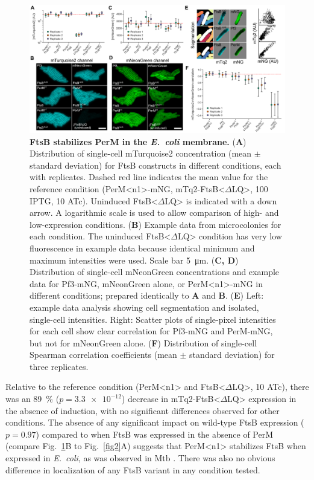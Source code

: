 \documentclass[twocolumn,pdflatex,sn-nature]{sn-jnl}%
\def\textsuperscript#1{<#1>}%
\newcommand\ec{\textit{E.~coli}}
\newcommand\mtb{Mtb}
\newcommand\ftsbdLQ{FtsB\textsuperscript{$\Delta{}$LQ}}
\newcommand\permN{PerM\textsuperscript{n1}}
\begin{document}
\begin{figure}[htb]
\centering
\includegraphics[width=1.0\textwidth]{../figures/fig3.png}
\caption{
    \textbf{FtsB stabilizes PerM in the \ec{} membrane.}
    (\textbf{A}) Distribution of single-cell mTurquoise2 concentration (mean $\pm$ standard deviation) for FtsB constructs in different conditions, each with replicates. Dashed red line indicates the mean value for the reference condition (\permN{}-mNG, mTq2-\ftsbdLQ{}, \qty{100}{\uM} IPTG, \qty{10}{\nM} ATc). Uninduced \ftsbdLQ{} is indicated with a down arrow. A logarithmic scale is used to allow comparison of high- and low-expression conditions.
    (\textbf{B}) Example data from microcolonies for each condition. The uninduced \ftsbdLQ{} condition has very low fluorescence in example data because identical minimum and maximum intensities were used. Scale bar \qty{5}{\um}.
    (\textbf{C, D}) Distribution of single-cell mNeonGreen concentrations and example data for Pf3-mNG, mNeonGreen alone, or \permN{}-mNG in different conditions; prepared identically to \textbf{A} and \textbf{B}.
    (\textbf{E}) Left: example data analysis showing cell segmentation and isolated, single-cell intensities. Right: Scatter plots of single-pixel intensities for each cell show clear correlation for Pf3-mNG and PerM-mNG, but not for mNeonGreen alone. (\textbf{F}) Distribution of single-cell Spearman correlation coefficients (mean $\pm$ standard deviation) for three replicates.
}\label{fig3}
\end{figure}

Relative to the reference condition (\permN{} and \ftsbdLQ{}, \qty{10}{\nM} ATc), there was an \qty{89}{\percent} ($p=\num{3.3e-12}$) decrease in mTq2-\ftsbdLQ{} expression in the absence of induction, with no significant differences observed for other conditions.
The absence of any significant impact on wild-type FtsB expression ($p=0.97$) compared to when FtsB was expressed in the absence of PerM (compare Fig.~\ref{fig3}B to Fig.~\ref{fig2}A) suggests that \permN{} stabilizes FtsB when expressed in \ec{}, as was observed in \mtb{} \citep{wangPersistentMycobacteriumTuberculosis2019}.
There was also no obvious difference in localization of any FtsB variant in any condition tested.
\end{document}
